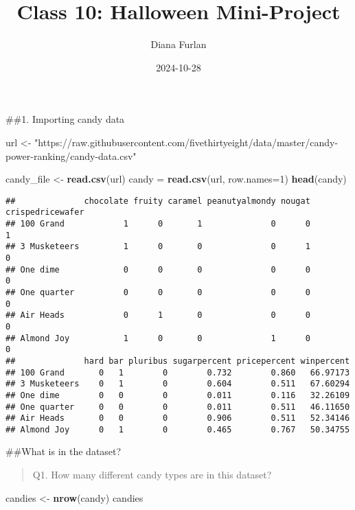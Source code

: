\documentclass[
]{article}
\title{Class 10: Halloween Mini-Project}
\author{Diana Furlan}
\date{2024-10-28}
\newenvironment{Shaded}{\begin{snugshade}}{\end{snugshade}}
\newcommand{\AttributeTok}[1]{\textcolor[rgb]{0.13,0.29,0.53}{#1}}
\newcommand{\DecValTok}[1]{\textcolor[rgb]{0.00,0.00,0.81}{#1}}
\newcommand{\FunctionTok}[1]{\textcolor[rgb]{0.13,0.29,0.53}{\textbf{#1}}}
\newcommand{\NormalTok}[1]{#1}
\newcommand{\OtherTok}[1]{\textcolor[rgb]{0.56,0.35,0.01}{#1}}
\newcommand{\StringTok}[1]{\textcolor[rgb]{0.31,0.60,0.02}{#1}}
\begin{document}
\maketitle

\#\#1. Importing candy data

\begin{Shaded}
\begin{Highlighting}[]
\NormalTok{url }\OtherTok{\textless{}{-}} \StringTok{"https://raw.githubusercontent.com/fivethirtyeight/data/master/candy{-}power{-}ranking/candy{-}data.csv"}

\NormalTok{candy\_file }\OtherTok{\textless{}{-}} \FunctionTok{read.csv}\NormalTok{(url)}
\NormalTok{candy }\OtherTok{=} \FunctionTok{read.csv}\NormalTok{(url, }\AttributeTok{row.names=}\DecValTok{1}\NormalTok{)}
\FunctionTok{head}\NormalTok{(candy)}
\end{Highlighting}
\end{Shaded}

\begin{verbatim}
##              chocolate fruity caramel peanutyalmondy nougat crispedricewafer
## 100 Grand            1      0       1              0      0                1
## 3 Musketeers         1      0       0              0      1                0
## One dime             0      0       0              0      0                0
## One quarter          0      0       0              0      0                0
## Air Heads            0      1       0              0      0                0
## Almond Joy           1      0       0              1      0                0
##              hard bar pluribus sugarpercent pricepercent winpercent
## 100 Grand       0   1        0        0.732        0.860   66.97173
## 3 Musketeers    0   1        0        0.604        0.511   67.60294
## One dime        0   0        0        0.011        0.116   32.26109
## One quarter     0   0        0        0.011        0.511   46.11650
## Air Heads       0   0        0        0.906        0.511   52.34146
## Almond Joy      0   1        0        0.465        0.767   50.34755
\end{verbatim}

\#\#What is in the dataset?

\begin{quote}
Q1. How many different candy types are in this dataset?
\end{quote}

\begin{Shaded}
\begin{Highlighting}[]
\NormalTok{candies }\OtherTok{\textless{}{-}} \FunctionTok{nrow}\NormalTok{(candy)}
\NormalTok{candies}
\end{Highlighting}
\end{Shaded}
\end{document}
